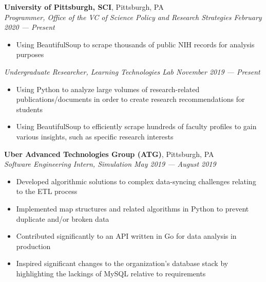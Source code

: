 \documentclass[11pt]{article}
\begin{document}
\begin{flushleft}
		\vspace{2.25mm}
		\textbf{University of Pittsburgh, SCI}, Pittsburgh, PA\\
		\textit{\small Programmer, Office of the VC of Science Policy and Research Strategies \hfill February 2020 --- Present}
		\vspace{-1.25mm}
		\begin{itemize}
				\item Using BeautifulSoup to scrape thousands of public NIH records for analysis purposes
		\end{itemize}
		\vspace{-1.25mm}
		\textit{\small Undergraduate Researcher, Learning Technologies Lab \hfill November 2019 --- Present}
		\vspace{-1.25mm}
		\begin{itemize}
				\item Using Python to analyze large volumes of research-related publications/documents in order to create research recommendations for students
				\vspace{-1.5mm}
				\item Using BeautifulSoup to efficiently scrape hundreds of faculty profiles to gain various insights, such as specific research interests
		\end{itemize}

		\textbf{Uber Advanced Technologies Group (ATG)}, Pittsburgh, PA\\
		\textit{\small Software Engineering Intern, Simulation \hfill May 2019 --- August 2019}
		\vspace{-1.25mm}
		\begin{itemize}
			\item Developed algorithmic solutions to complex data-syncing challenges relating to the ETL process
			\vspace{-1.5mm}
			\item Implemented map structures and related algorithms in Python to prevent duplicate and/or broken data
			\vspace{-1.5mm}
			\item Contributed significantly to an API written in Go for data analysis in production
			\vspace{-1.5mm}
			\item Inspired significant changes to the organization's database stack by highlighting the lackings of MySQL relative to requirements
		\end{itemize}
	

\end{flushleft}
\end{document}
